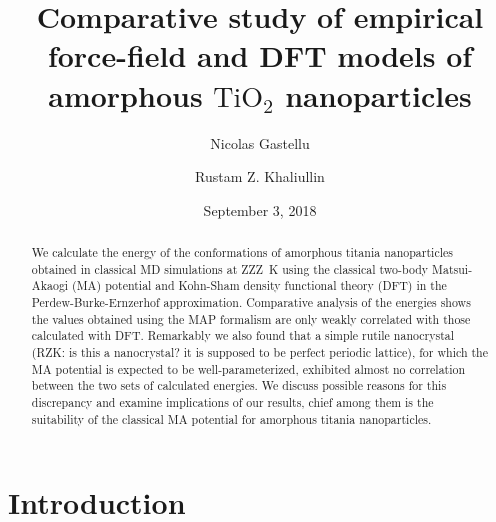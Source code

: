 \documentclass[aps,prb,twocolumn,amsmath,amssymb,superscriptaddress,longbibliography]{revtex4-1}
\begin{document}
\title{
Comparative study of empirical force-field and DFT models of amorphous $\text{TiO}_2$ nanoparticles
}

\author{Nicolas Gastellu}
\author{Rustam Z. Khaliullin}

\date{September 3, 2018}

\begin{abstract}

We calculate the energy of the conformations of amorphous titania nanoparticles obtained in classical MD simulations at ZZZ~K using the classical two-body Matsui-Akaogi (MA) potential and Kohn-Sham density functional theory (DFT) in the Perdew-Burke-Ernzerhof approximation. 
Comparative analysis of the energies shows the values obtained using the MAP formalism are only weakly correlated with those calculated with DFT. 
Remarkably we also found that a simple rutile nanocrystal (RZK: is this a nanocrystal? it is supposed to be perfect periodic lattice), for which the MA potential is expected to be well-parameterized, exhibited almost no correlation between the two sets of calculated energies. 
We discuss possible reasons for this discrepancy and examine implications of our results, chief among them is the suitability of the classical MA potential for amorphous titania nanoparticles.


\end{abstract}

\maketitle
 

\section*{Introduction} 
\end{document}
